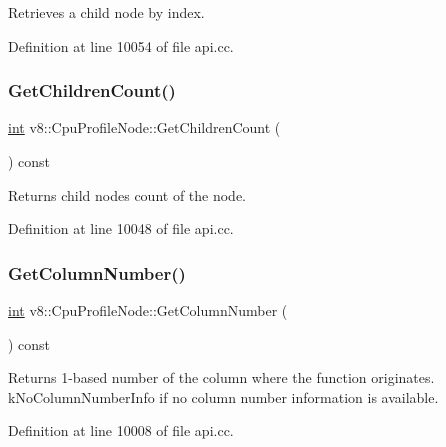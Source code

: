 Retrieves a child node by index. 

Definition at line 10054 of file api.\+cc.

\mbox{\label{classv8_1_1CpuProfileNode_afc0f772f6dad49b670c7b9675d27c688}} 
\subsubsection{\texorpdfstring{Get\+Children\+Count()}{GetChildrenCount()}}
{\footnotesize\ttfamily \mbox{\hyperlink{classint}{int}} v8\+::\+Cpu\+Profile\+Node\+::\+Get\+Children\+Count (\begin{DoxyParamCaption}{ }\end{DoxyParamCaption}) const}

Returns child nodes count of the node. 

Definition at line 10048 of file api.\+cc.

\mbox{\label{classv8_1_1CpuProfileNode_a9df61090cf365f1f03d5bce44653f1f5}} 
\subsubsection{\texorpdfstring{Get\+Column\+Number()}{GetColumnNumber()}}
{\footnotesize\ttfamily \mbox{\hyperlink{classint}{int}} v8\+::\+Cpu\+Profile\+Node\+::\+Get\+Column\+Number (\begin{DoxyParamCaption}{ }\end{DoxyParamCaption}) const}

Returns 1-\/based number of the column where the function originates. k\+No\+Column\+Number\+Info if no column number information is available. 

Definition at line 10008 of file api.\+cc.

\mbox{\label{classv8_1_1CpuProfileNode_a89b7835d63743c30b59ba3752299f2ce}} 
